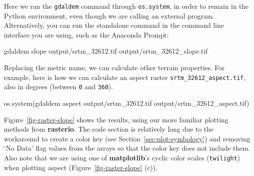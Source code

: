 \documentclass[
  letterpaper,
]{krantz}
\newenvironment{Shaded}{\begin{snugshade}}{\end{snugshade}}
\newcommand{\NormalTok}[1]{\textcolor[rgb]{0.00,0.23,0.31}{#1}}
\newcommand{\StringTok}[1]{\textcolor[rgb]{0.13,0.47,0.30}{#1}}
\begin{document}
Here we ran the \texttt{gdaldem} command through \texttt{os.system}, in
order to remain in the Python environment, even though we are calling an
external program. Alternatively, you can run the standalone command in
the command line interface you are using, such as the Anaconda Prompt:

\begin{Shaded}
\begin{Highlighting}[]
\NormalTok{gdaldem slope output/srtm\_32612.tif output/srtm\_32612\_slope.tif}
\end{Highlighting}
\end{Shaded}

Replacing the metric name, we can calculate other terrain properties.
For example, here is how we can calculate an aspect raster
\texttt{srtm\_32612\_aspect.tif}, also in degrees (between \texttt{0}
and \texttt{360}).

\begin{Shaded}
\begin{Highlighting}[]
\NormalTok{os.system(}\StringTok{\textquotesingle{}gdaldem aspect output/srtm\_32612.tif output/srtm\_32612\_aspect.tif\textquotesingle{}}\NormalTok{)}
\end{Highlighting}
\end{Shaded}

Figure~\ref{fig-raster-slope} shows the results, using our more familiar
plotting methods from \textbf{rasterio}. The code section is relatively
long due to the workaround to create a color key (see
Section~\ref{sec-plot-symbology}) and removing `No Data' flag values
from the arrays so that the color key does not include them. Also note
that we are using one of \textbf{matplotlib}'s cyclic color scales
(\texttt{\textquotesingle{}twilight\textquotesingle{}}) when plotting
aspect (Figure~\ref{fig-raster-slope} (c)).
\end{document}
